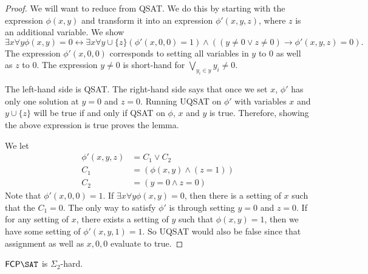 \documentclass[runningheads,a4paper]{llncs}
\begin{document}
\begin{proof}
We will want to reduce from QSAT. We do this by starting with the expression $\phi(x,y)$ and transform it into an expression $\phi'(x, y, z)$, where $z$ is an additional variable. We show
\[ \exists x \forall y \phi(x,y) = 0 \leftrightarrow \exists x \forall y\cup \{z\} \left(\phi'(x, 0, 0) = 1 \right) \wedge \left((y \neq 0 \vee z \neq 0 ) \rightarrow \phi'(x, y, z) = 0 \right). \]
The expression $\phi'(x, 0, 0)$ corresponds to setting all variables in $y$ to $0$ as well as $z$ to 0. The expression $y \neq 0$ is short-hand for $\bigvee_{y_i \in y} y_i \neq 0$. 

The left-hand side is QSAT. The right-hand side says that once we set $x$, $\phi'$ has only one solution at $y=0$ and $z = 0$. Running UQSAT on $\phi'$ with variables $x$ and $y \cup \{z\}$ will be true if and only if QSAT on $\phi$, $x$ and $y$ is true. Therefore, showing the above expression is true proves the lemma.

We let 
\begin{align}
\phi'(x, y, z) &= C_1 \vee C_2 \\
		    C_1 &=\left(\phi(x, y) \wedge (z = 1)\right) \\
		   C_2 &=  \left( y = 0 \wedge z = 0 \right) 
\end{align}
Note that $\phi'(x, 0, 0) = 1$. If $\exists x \forall y \phi(x, y)= 0$, then there is a setting of $x$ such that the $C_1 = 0$. The only way to satisfy $\phi'$ is through setting $y = 0$ and $z = 0$. If for any setting of $x$, there exists a setting of $y$ such that $\phi(x, y) = 1$, then we have some setting of $\phi'(x, y, 1) = 1$. So UQSAT would also be false since that assignment as well as $x, 0, 0$ evaluate to true.
\end{proof}

\begin{proposition}
\label{prop:fcpsatsigmacomp}
$\mathsf{FCP} \SAT$ is $\Sigma_2$-hard.
\end{proposition}
\end{document}
